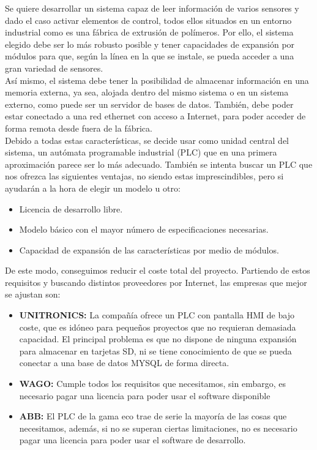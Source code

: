 Se quiere desarrollar un sistema capaz de leer información de varios sensores y dado el caso activar elementos de control, todos ellos situados en un entorno industrial como es una fábrica de extrusión de polímeros. Por ello, el sistema elegido debe ser lo más robusto posible y tener capacidades de expansión por módulos para que, según la línea en la que se instale, se pueda acceder a una gran variedad de sensores.\\ 

Así mismo, el sistema debe tener la posibilidad de almacenar información en una memoria externa, ya sea, alojada dentro del mismo sistema o en un sistema externo, como puede ser un servidor de bases de datos. También, debe poder estar conectado a una red ethernet con acceso a Internet, para poder acceder de forma remota desde fuera de la fábrica.\\ 

Debido a todas estas características, se decide usar como unidad central del sistema, un autómata programable industrial (PLC) que en una primera aproximación parece ser lo más adecuado. También se intenta buscar un PLC que nos ofrezca las siguientes ventajas, no siendo estas imprescindibles, pero si ayudarán a la hora de elegir un modelo u otro:

\begin{itemize}
		\item{Licencia de desarrollo libre.}
		\item{Modelo básico con el mayor número de especificaciones necesarias.}
		\item{Capacidad de expansión de las características por medio de módulos.}
\end{itemize}

De este modo, conseguimos reducir el coste total del proyecto. Partiendo de estos requisitos y buscando distintos proveedores por Internet, las empresas que mejor se ajustan son:

\begin{itemize}
		\item{\textbf{UNITRONICS:} La compañía ofrece un PLC con pantalla HMI de bajo coste, que es idóneo para pequeños proyectos que no requieran demasiada capacidad. El principal problema es que no dispone de ninguna expansión para almacenar en tarjetas SD, ni se tiene conocimiento de que se pueda conectar a una base de datos MYSQL de forma directa.}
		\item{\textbf{WAGO:} Cumple todos los requisitos que necesitamos, sin embargo, es necesario pagar una licencia para poder usar el software disponible}
		\item{\textbf{ABB:} El PLC de la gama eco trae de serie la mayoría de las cosas que necesitamos, además, si no se superan ciertas limitaciones, no es necesario pagar una licencia para poder usar el software de desarrollo.}
\end{itemize}

